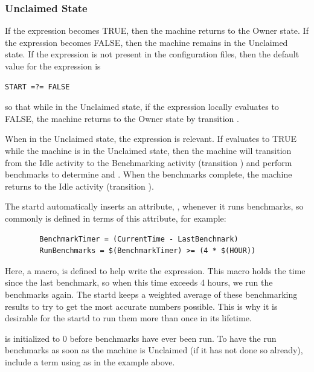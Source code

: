 \subsubsection{\label{sec:Unclaimed-State}Unclaimed State}

If the  expression becomes TRUE, then the machine returns
to the Owner state.
If the  expression becomes FALSE, then the machine remains
in the Unclaimed state.
If the  expression is not present in the configuration files,
then the default value for the  expression is 
\begin{verbatim}
START =?= FALSE
\end{verbatim}
so that
while in the Unclaimed state, if the  expression locally
evaluates to FALSE, the machine returns to the Owner state by
transition .

When in the Unclaimed state,
the  \label{param:RunBenchmarks}  
expression is relevant.
If  evaluates to TRUE while the machine
is in the Unclaimed state,
then the machine will transition from the Idle
activity to the Benchmarking activity (transition ) and
perform benchmarks to determine  and .  
When the benchmarks complete, the machine returns to the Idle activity
(transition ).

The startd automatically inserts an attribute, ,
whenever it runs benchmarks, so commonly  is
defined in terms of this attribute, for example:
\begin{verbatim}
        BenchmarkTimer = (CurrentTime - LastBenchmark)
        RunBenchmarks = $(BenchmarkTimer) >= (4 * $(HOUR))
\end{verbatim}
Here, a macro,  is defined to help write the
expression.
This macro holds the time since the last benchmark,
so when this time exceeds 4 hours, we run the benchmarks again.
The startd keeps a weighted average of these benchmarking
results to try to get the most accurate numbers possible.
This is why
it is desirable for 
the startd to run them more than once in its lifetime.

\Note {} is initialized to 0 before benchmarks
have ever been run.
To have the  run benchmarks as soon as the machine is
Unclaimed (if it has not done so already),
include a term using  as in the example above.

